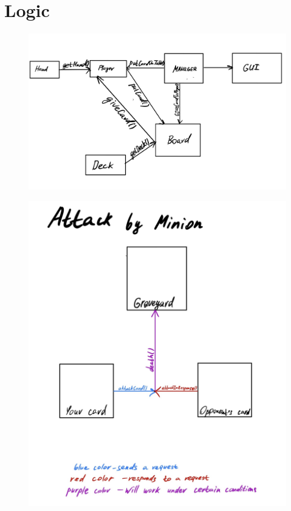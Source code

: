\documentclass[12pt,a4paper]{article}
\begin{document}
\section{Logic}
\begin{figure}[h]
\centering 
\includegraphics[width=1\textwidth]{img/Logic.jpg}
\end{figure}
\begin{figure}[h]
\centering 
\includegraphics[width=1\textwidth]{img/minion.jpg}
\end{figure}
\end{document}

